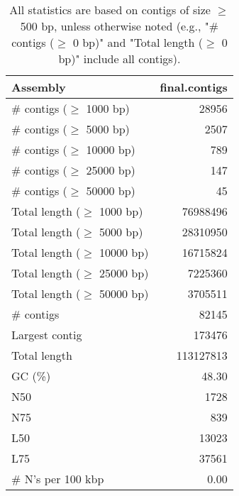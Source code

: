 \documentclass[12pt,a4paper]{article}
\begin{document}
\begin{table}[ht]
\begin{center}
\caption{All statistics are based on contigs of size $\geq$ 500 bp, unless otherwise noted (e.g., "\# contigs ($\geq$ 0 bp)" and "Total length ($\geq$ 0 bp)" include all contigs).}
\begin{tabular}{|l*{1}{|r}|}
\hline
Assembly & final.contigs \\ \hline
\# contigs ($\geq$ 1000 bp) & 28956 \\ \hline
\# contigs ($\geq$ 5000 bp) & 2507 \\ \hline
\# contigs ($\geq$ 10000 bp) & 789 \\ \hline
\# contigs ($\geq$ 25000 bp) & 147 \\ \hline
\# contigs ($\geq$ 50000 bp) & 45 \\ \hline
Total length ($\geq$ 1000 bp) & 76988496 \\ \hline
Total length ($\geq$ 5000 bp) & 28310950 \\ \hline
Total length ($\geq$ 10000 bp) & 16715824 \\ \hline
Total length ($\geq$ 25000 bp) & 7225360 \\ \hline
Total length ($\geq$ 50000 bp) & 3705511 \\ \hline
\# contigs & 82145 \\ \hline
Largest contig & 173476 \\ \hline
Total length & 113127813 \\ \hline
GC (\%) & 48.30 \\ \hline
N50 & 1728 \\ \hline
N75 & 839 \\ \hline
L50 & 13023 \\ \hline
L75 & 37561 \\ \hline
\# N's per 100 kbp & 0.00 \\ \hline
\end{tabular}
\end{center}
\end{table}
\end{document}
